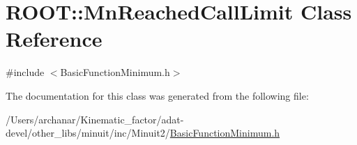\hypertarget{classROOT_1_1Minuit2_1_1BasicFunctionMinimum_1_1MnReachedCallLimit}{}\section{R\+O\+OT\+:\+:Mn\+Reached\+Call\+Limit Class Reference}
\label{classROOT_1_1Minuit2_1_1BasicFunctionMinimum_1_1MnReachedCallLimit}


{\ttfamily \#include $<$Basic\+Function\+Minimum.\+h$>$}



The documentation for this class was generated from the following file\+:\begin{DoxyCompactItemize}
\item 
/\+Users/archanar/\+Kinematic\+\_\+factor/adat-\/devel/other\+\_\+libs/minuit/inc/\+Minuit2/\mbox{\hyperlink{adat-devel_2other__libs_2minuit_2inc_2Minuit2_2BasicFunctionMinimum_8h}{Basic\+Function\+Minimum.\+h}}\end{DoxyCompactItemize}
